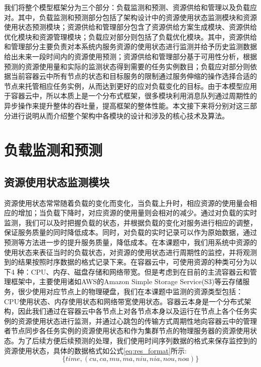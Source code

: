 我们将整个模型框架分为三个部分：负载监测和预测、资源供给和管理以及负载应对。其中，负载监测和预测部分包括了架构设计中的资源使用状态监测模块和资源使用状态预测模块；资源供给和管理部分包含了资源供给方案生成模块、资源供给优化模块和资源管理模块；负载应对部分则包括了负载优化模块。其中，资源供给和管理部分主要负责对本系统内服务资源的使用状态进行监测并给予历史监测数据给出未来一段时间内的资源使用预测；资源供给和管理部分基于可用性分析，根据预测的资源使用量和实际的监测状态得到需要的任务实例数目；负载应对部分则依据当前容器云中所有节点的状态和目标服务的限制通过服务伸缩的操作选择合适的节点来托管相应任务实例，从而达到更好的应对负载变化的目标。由于本模型应用于容器云中，所以本质上是一个分布式框架，很多模块利用消息队列通过周期性的异步操作来提升整体的吞吐量，提高框架的整体性能。本文接下来将分别对这三部分进行说明从而介绍整个架构中各模块的设计和涉及的核心技术及算法。

\section{负载监测和预测}
\subsection{资源使用状态监测模块}\label{sec:monitor}
资源使用状态常常随着负载的变化而变化，当负载上升时，相应资源的使用量会相应的增加；当负载下降时，对应资源的使用量则会相对的减少。通过对负载的实时监测，我们可以及时把握负载的状态，并根据负载的变化对服务进行相应的调整，保证服务质量的同时降低成本。同时，对负载的实时记录可以作为原始数据，通过预测等方法进一步的提升服务质量，降低成本。在本课题中，我们用系统中资源的使用状态来表征当时的负载状态，对资源的使用状态进行周期性的监控，并将观测到的结果按照时序数据的格式记录下来。在容器云中，可使用资源的种类可分为以下4 种：CPU、内存、磁盘存储和网络带宽。但是考虑到在目前的主流容器云和管理框架中，主要使用诸如AWS的Amazon Simple Storage Service(S3)等云存储服务，很少使用对应节点上的物理硬盘，我们在本课题中监测的资源类型包括：CPU使用状态、内存使用状态和网络带宽使用状态。容器云本身是一个分布式架构，因此我们通过在容器云中各节点上对各节点本身以及运行在节点上各个任务实例的资源使用状态进行监测，并通过心跳包的传输方式周期性地向容器云中的管理者节点同步各任务实例的资源使用状态和作为集群节点的物理服务器的资源使用状态。为了后续方便后续预测的处理，我们使用时间序列数据的格式来保存监控到的资源使用状态，具体的数据格式如公式\ref{eq:res_format}所示:
\begin{equation}\label{eq:res_format}
\{time, (cu, ca, mu, ma, niu, nia, nou, noa)\}
\end{equation}

